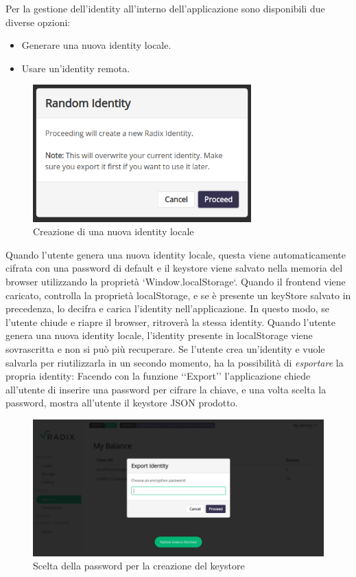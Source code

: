 Per la gestione dell'identity all'interno dell'applicazione sono disponibili due diverse opzioni:
\begin{itemize}
    \item Generare una nuova identity locale.
    \item Usare un'identity remota.
\end{itemize}

\begin{figure}[H]
  \centering
  \includegraphics[width=0.75\textwidth]{images/application/create_random.png}
  \caption{Creazione di una nuova identity locale}
  \label{fig:identity_creation}
\end{figure}

Quando l'utente genera una nuova identity locale, questa viene automaticamente cifrata con una password di default e il keystore viene salvato nella memoria del browser utilizzando la proprietà `Window.localStorage`. Quando il frontend viene caricato, controlla la proprietà localStorage, e se è presente un keyStore salvato in precedenza, lo decifra e carica l'identity nell'applicazione. In questo modo, se l'utente chiude e riapre il browser, ritroverà la stessa identity. Quando l'utente genera una nuova identity locale, l'identity presente in localStorage viene sovrascritta e non si può più recuperare. Se l'utente crea un'identity e vuole salvarla per riutilizzarla in un secondo momento, ha la possibilità di \textit{esportare} la propria identity: Facendo con la funzione ‘‘Export’’ l'applicazione chiede all'utente di inserire una password per cifrare la chiave, e una volta scelta la password, mostra all'utente il keystore JSON prodotto. 

\begin{figure}[H]
    \includegraphics[width=\linewidth]{images/application/choose-password.png}
    \caption{Scelta della password per la creazione del keystore}
    \label{fig:choose_password}
\end{figure}

